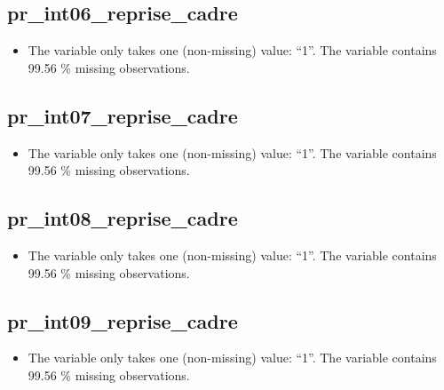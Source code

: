 \documentclass[
  letterpaper,
  DIV=11,
  numbers=noendperiod]{scrartcl}
\providecommand{\tightlist}{%
  \setlength{\itemsep}{0pt}\setlength{\parskip}{0pt}}
\begin{document}
\emini

\fullline

\subsection{pr\_int06\_reprise\_cadre}\label{pr_int06_reprise_cadre}

\begin{itemize}
\tightlist
\item
  The variable only takes one (non-missing) value: ``1''. The variable
  contains 99.56 \% missing observations.
\end{itemize}

\fullline

\subsection{pr\_int07\_reprise\_cadre}\label{pr_int07_reprise_cadre}

\begin{itemize}
\tightlist
\item
  The variable only takes one (non-missing) value: ``1''. The variable
  contains 99.56 \% missing observations.
\end{itemize}

\fullline

\subsection{pr\_int08\_reprise\_cadre}\label{pr_int08_reprise_cadre}

\begin{itemize}
\tightlist
\item
  The variable only takes one (non-missing) value: ``1''. The variable
  contains 99.56 \% missing observations.
\end{itemize}

\fullline

\subsection{pr\_int09\_reprise\_cadre}\label{pr_int09_reprise_cadre}

\begin{itemize}
\tightlist
\item
  The variable only takes one (non-missing) value: ``1''. The variable
  contains 99.56 \% missing observations.
\end{itemize}
\end{document}
